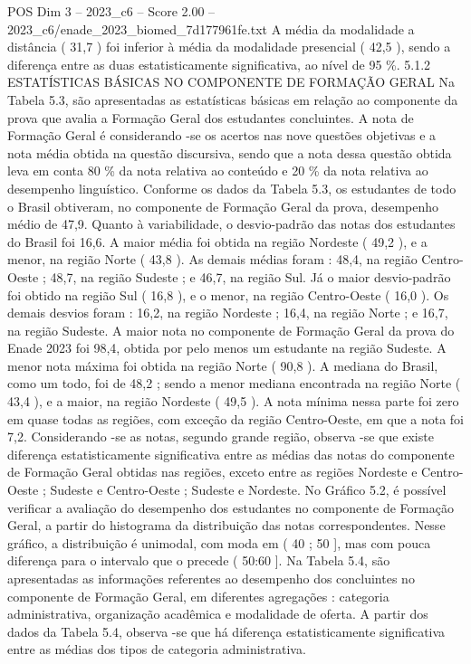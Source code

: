 \begin{textsample}{POS Dim 3 – 2023\_c6 – Score 2.00 – 2023\_c6/enade\_2023\_biomed\_7d177961fe.txt}
A média da modalidade a distância ( 31,7 ) foi inferior à média da modalidade presencial ( 42,5 ), sendo a diferença entre as duas estatisticamente significativa, ao nível de 95 \%. 5.1.2 ESTATÍSTICAS BÁSICAS NO COMPONENTE DE FORMAÇÃO GERAL Na Tabela 5.3, são apresentadas as estatísticas básicas em relação ao componente da prova que avalia a Formação Geral dos estudantes concluintes.
A nota de Formação Geral é considerando -se os acertos nas nove questões objetivas e a nota média obtida na questão discursiva, sendo que a nota dessa questão obtida leva em conta 80 \% da nota relativa ao conteúdo e 20 \% da nota relativa ao desempenho linguístico.
Conforme os dados da Tabela 5.3, os estudantes de todo o Brasil obtiveram, no componente de Formação Geral da prova, desempenho médio de 47,9.
Quanto à variabilidade, o desvio-padrão das notas dos estudantes do Brasil foi 16,6.
A maior média foi obtida na região Nordeste ( 49,2 ), e a menor, na região Norte ( 43,8 ).
As demais médias foram : 48,4, na região Centro-Oeste ; 48,7, na região Sudeste ; e 46,7, na região Sul.
Já o maior desvio-padrão foi obtido na região Sul ( 16,8 ), e o menor, na região Centro-Oeste ( 16,0 ).
Os demais desvios foram : 16,2, na região Nordeste ; 16,4, na região Norte ; e 16,7, na região Sudeste.
A maior nota no componente de Formação Geral da prova do Enade 2023 foi 98,4, obtida por pelo menos um estudante na região Sudeste.
A menor nota máxima foi obtida na região Norte ( 90,8 ).
A mediana do Brasil, como um todo, foi de 48,2 ; sendo a menor mediana encontrada na região Norte ( 43,4 ), e a maior, na região Nordeste ( 49,5 ).
A nota mínima nessa parte foi zero em quase todas as regiões, com exceção da região Centro-Oeste, em que a nota foi 7,2.
Considerando -se as notas, segundo grande região, observa -se que existe diferença estatisticamente significativa entre as médias das notas do componente de Formação Geral obtidas nas regiões, exceto entre as regiões Nordeste e Centro-Oeste ; Sudeste e Centro-Oeste ; Sudeste e Nordeste.
No Gráfico 5.2, é possível verificar a avaliação do desempenho dos estudantes no componente de Formação Geral, a partir do histograma da distribuição das notas correspondentes.
Nesse gráfico, a distribuição é unimodal, com moda em ( 40 ; 50 ], mas com pouca diferença para o intervalo que o precede ( 50:60 ].
Na Tabela 5.4, são apresentadas as informações referentes ao desempenho dos concluintes no componente de Formação Geral, em diferentes agregações : categoria administrativa, organização acadêmica e modalidade de oferta.
A partir dos dados da Tabela 5.4, observa -se que há diferença estatisticamente significativa entre as médias dos tipos de categoria administrativa.

\end{textsample}
